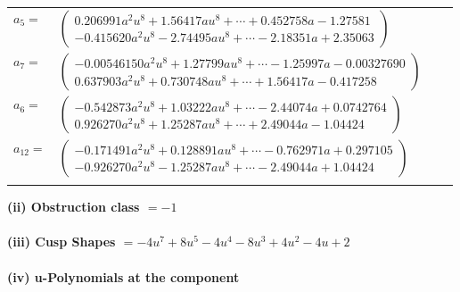 \documentclass[1p]{elsarticle_modified}
\theoremstyle{definition}
\begin{document}
\begin{tabular}{m{7pt} m{180pt} m{7pt} m{180pt} }
\flushright $a_{5}=$&$\begin{pmatrix}0.206991 a^{2} u^{8}+1.56417 a u^{8}+\cdots+0.452758 a-1.27581\\-0.415620 a^{2} u^{8}-2.74495 a u^{8}+\cdots-2.18351 a+2.35063\end{pmatrix}$ \\
\flushright $a_{7}=$&$\begin{pmatrix}-0.00546150 a^{2} u^{8}+1.27799 a u^{8}+\cdots-1.25997 a-0.00327690\\0.637903 a^{2} u^{8}+0.730748 a u^{8}+\cdots+1.56417 a-0.417258\end{pmatrix}$ \\
\flushright $a_{6}=$&$\begin{pmatrix}-0.542873 a^{2} u^{8}+1.03222 a u^{8}+\cdots-2.44074 a+0.0742764\\0.926270 a^{2} u^{8}+1.25287 a u^{8}+\cdots+2.49044 a-1.04424\end{pmatrix}$ \\
\flushright $a_{12}=$&$\begin{pmatrix}-0.171491 a^{2} u^{8}+0.128891 a u^{8}+\cdots-0.762971 a+0.297105\\-0.926270 a^{2} u^{8}-1.25287 a u^{8}+\cdots-2.49044 a+1.04424\end{pmatrix}$\\&\end{tabular}
\flushleft \textbf{(ii) Obstruction class $= -1$}\\~\\
\flushleft \textbf{(iii) Cusp Shapes $= -4 u^7+8 u^5-4 u^4-8 u^3+4 u^2-4 u+2$}\\~\\
\newpage\renewcommand{\arraystretch}{1}
\flushleft \textbf{(iv) u-Polynomials at the component}\newline \\
\end{document}
